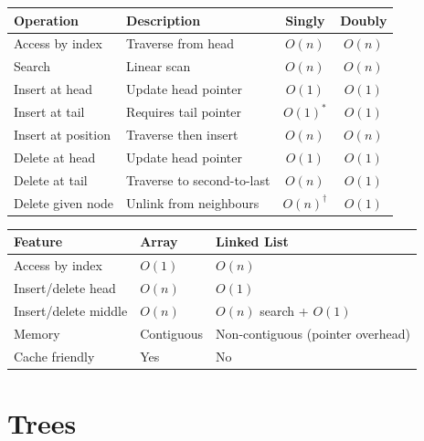 \documentclass[oneside]{book}
\begin{document}
\begin{center}
\begin{tabularx}{\linewidth}{lXcc}
\toprule
\textbf{Operation} & \textbf{Description} & \textbf{Singly} & \textbf{Doubly} \\
\midrule
Access by index      & Traverse from head        & $O(n)$ & $O(n)$ \\
Search               & Linear scan               & $O(n)$ & $O(n)$ \\
Insert at head       & Update head pointer       & $O(1)$ & $O(1)$ \\
Insert at tail       & Requires tail pointer     & $O(1)^*$ & $O(1)$ \\
Insert at position   & Traverse then insert      & $O(n)$ & $O(n)$ \\
Delete at head       & Update head pointer       & $O(1)$ & $O(1)$ \\
Delete at tail       & Traverse to second-to-last & $O(n)$ & $O(1)$ \\
Delete given node    & Unlink from neighbours    & $O(n)^\dagger$ & $O(1)$ \\
\bottomrule
\end{tabularx}
\end{center}


\begin{center}
\begin{tabularx}{\linewidth}{lXX}
\toprule
\textbf{Feature} & \textbf{Array} & \textbf{Linked List} \\
\midrule
Access by index  & $O(1)$  & $O(n)$ \\
Insert/delete head & $O(n)$ & $O(1)$ \\
Insert/delete middle & $O(n)$ & $O(n)$ search + $O(1)$ \\
Memory           & Contiguous     & Non-contiguous (pointer overhead) \\
Cache friendly   & Yes            & No \\
\bottomrule
\end{tabularx}
\end{center}

\section{Trees}
\end{document}
